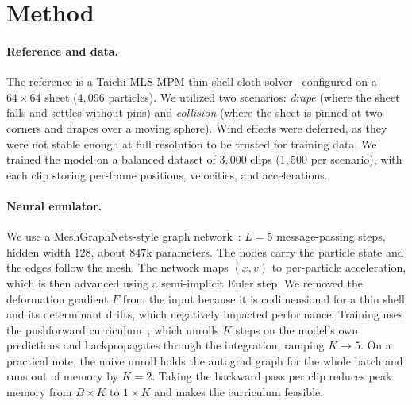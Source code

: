 \documentclass{article}
\begin{document}
\section{Method}

\paragraph{Reference and data.} The reference is a Taichi MLS-MPM thin-shell cloth
solver~\citep{hu2018mlsmpm, hu2020difftaichi} configured on a $64\times64$ sheet
($4{,}096$ particles). We utilized two scenarios: \emph{drape} (where the sheet falls and settles without
pins) and \emph{collision} (where the sheet is pinned at two corners and drapes over a moving sphere).
Wind effects were deferred, as they were not stable enough at full resolution to be trusted for training data. We trained the model on a balanced dataset of $3{,}000$ clips ($1{,}500$ per scenario), with each clip storing per-frame positions, velocities, and accelerations.

\paragraph{Neural emulator.} We use a MeshGraphNets-style graph
network~\citep{pfaff2021mgn}: $L{=}5$ message-passing steps, hidden width $128$,
about $847$k parameters. The nodes carry the particle state and the edges follow the mesh.
The network maps $(x, v)$ to per-particle acceleration, which is then advanced using a semi-implicit Euler step. We removed the deformation gradient $F$ from the input because it is codimensional for a thin shell and its determinant drifts, which negatively impacted performance. Training
uses the pushforward curriculum~\citep{brandstetter2022mpnn}, which unrolls $K$ steps on the
model's own predictions and backpropagates through the integration, ramping
$K \to 5$. On a practical note, the naive unroll holds the
autograd graph for the whole batch and runs out of memory by $K{=}2$. Taking the backward pass per clip reduces
peak memory from $B{\times}K$ to $1{\times}K$ and makes the curriculum feasible.
\end{document}
